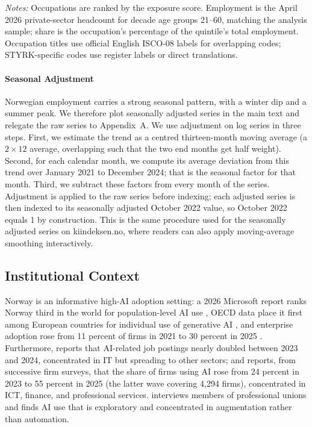 \documentclass[12pt]{article}
\begin{document}
\begin{table}[htbp]
\centering
\caption{Five largest private-sector occupations by AI-exposure quintile, April 2026.}
\label{tab:quintile_top_occ}
\footnotesize

\begin{minipage}{\textwidth}\footnotesize\textit{Notes:} Occupations are ranked by the \citet{eloundou2024} exposure score. Employment is the April 2026 private-sector headcount for decade age groups 21--60, matching the analysis sample; share is the occupation's percentage of the quintile's total employment. Occupation titles use official English ISCO-08 labels for overlapping codes; STYRK-specific codes use register labels or direct translations.\end{minipage}
\end{table}


\paragraph{Seasonal Adjustment}

Norwegian employment carries a strong seasonal pattern, with a winter dip and a summer peak. We therefore plot seasonally adjusted series in the main text and relegate the raw series to Appendix~A. We use adjustment on log series in three steps. First, we estimate the trend as a centred thirteen-month moving average (a $2\times12$ average, overlapping such that the two end months get half weight). Second, for each calendar month, we compute its average deviation from this trend over January 2021 to December 2024; that is the seasonal factor for that month. Third, we subtract these factors from every month of the series. Adjustment is applied to the raw series before indexing; each adjusted series is then indexed to its seasonally adjusted October 2022 value, so October 2022 equals 1 by construction. This is the same procedure used for the seasonally adjusted series on kiindeksen.no, where readers can also apply moving-average smoothing interactively.


\subsection{Institutional Context}\label{sec:data:institutions}

Norway is an informative high-AI adoption setting: a 2026 Microsoft report ranks Norway third in the world for population-level AI use \citep{microsoft2026ai}, OECD data place it first among European countries for individual use of generative AI \citep{oecd2026ai}, and enterprise adoption rose from 11 percent of firms in 2021 to 30 percent in 2025 \citep{ssb2025ikt}. Furthermore, \citet{kompetansebehovsutvalget2026} reports that AI-related job postings nearly doubled between 2023 and 2024, concentrated in IT but spreading to other sectors; and \citet{samfunnsok2026} reports, from successive firm surveys, that the share of firms using AI rose from 24 percent in 2023 to 55 percent in 2025 (the latter wave covering 4{,}294 firms), concentrated in ICT, finance, and professional services. \citet{nifu2024} interviews members of professional unions and finds AI use that is exploratory and concentrated in augmentation rather than automation.
\end{document}
